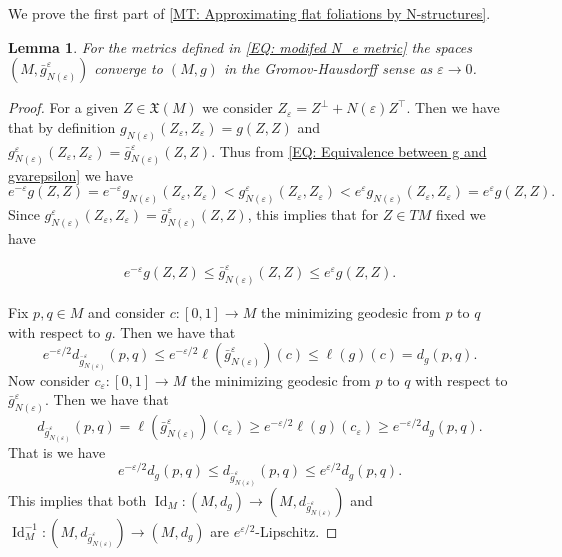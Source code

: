\documentclass[12pt,a4paper,reqno]{amsart}
\newtheorem{lemma}[theorem]{Lemma}
\theoremstyle{definition}
\numberwithin{equation}{section}
\newcommand{\X}{\mathfrak{X}}
\DeclareMathOperator{\Id}{Id}
\begin{document}
We prove the first part of \th\ref{MT: Approximating flat foliations by N-structures}.


\begin{lemma}\th\label{L: modified metric converge GH to g}
For the metrics defined in \eqref{EQ: modifed N_e metric} the spaces $(M,\bar{g}^\varepsilon_{N(\varepsilon)})$ converge to $(M,g)$ in the Gromov-Hausdorff sense as $\varepsilon\to 0$.
\end{lemma}


\begin{proof}
For a given $Z\in \X(M)$ we consider $Z_\varepsilon = Z^\perp+N(\varepsilon)Z^\top$. Then we have that by definition $g_{N(\varepsilon)} (Z_\varepsilon,Z_\varepsilon)= g(Z,Z)$ and $g^\varepsilon_{N(\varepsilon)}(Z_\varepsilon,Z_\varepsilon) = \bar{g}^\varepsilon_{N(\varepsilon)}(Z,Z)$. Thus from \eqref{EQ: Equivalence between g and gvarepsilon} we have
\[
e^{-\varepsilon}g(Z,Z) = e^{-\varepsilon}g_{N(\varepsilon)} (Z_\varepsilon,Z_\varepsilon)<g^\varepsilon_{N(\varepsilon)} (Z_\varepsilon,Z_\varepsilon)%
 <e^{\varepsilon}g_{N(\varepsilon)} (Z_\varepsilon,Z_\varepsilon) = e^{\varepsilon}g(Z,Z).
\]
Since $g^\varepsilon_{N(\varepsilon)} (Z_\varepsilon,Z_\varepsilon) = \bar{g}^\varepsilon_{N(\varepsilon)} (Z,Z)$, this implies that for $Z\in TM$ fixed we have 
\begin{linenomath}
\begin{align}
e^{-\varepsilon}g(Z,Z)\leq \bar{g}^\varepsilon_{N(\varepsilon)}(Z,Z) \leq e^{\varepsilon}g(Z,Z).\label{EQ: Converges of bar g}
\end{align}
\end{linenomath}

Fix $p,q\in M$ and consider $c\colon [0,1]\to M$ the minimizing geodesic from $p$ to $q$ with respect to $g$. Then we have that
\[
e^{-\varepsilon/2} d_{\bar{g}^\varepsilon_{N(\varepsilon)}}(p,q) \leq e^{-\varepsilon/2}\ell(\bar{g}^\varepsilon_{N(\varepsilon)})(c)\leq \ell(g)(c) = d_g(p,q).
\]
Now consider $c_\varepsilon\colon [0,1]\to M$ the minimizing geodesic from  $p$ to $q$ with respect to $\bar{g}^\varepsilon_{N(\varepsilon)}$. Then we have that
\[
d_{\bar{g}^\varepsilon_{N(\varepsilon)}}(p,q) = \ell(\bar{g}^\varepsilon_{N(\varepsilon)})(c_\varepsilon) \geq e^{-\varepsilon/2}\ell(g)(c_\varepsilon)\geq e^{-\varepsilon/2}d_g(p,q).
\]
That is we have 
\[
e^{-\varepsilon/2}d_g(p,q)\leq d_{\bar{g}^\varepsilon_{N(\varepsilon)}}(p,q)\leq e^{\varepsilon/2}d_g(p,q).
\]
This implies that both $\Id_M\colon (M,d_g)\to (M,d_{\bar{g}^\varepsilon_{N(\varepsilon)}})$ and $\Id^{-1}_M\colon (M,d_{\bar{g}^\varepsilon_{N(\varepsilon)}})\to (M,d_g)$ are $e^{\varepsilon/2}$-Lipschitz. 


\end{proof}
\end{document}

